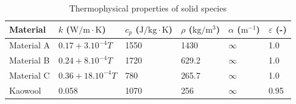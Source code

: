 \documentclass[12pt]{article}
\begin{document}
\begin{table}[H]
\centering
\caption{Thermophysical properties of solid species}
\label{tab:phys_props}
\begin{tabular}{@{}llllll@{}}
\toprule
Material & $k$ ($\mathrm{W/m{\cdot}K}$) & $c_p$ ($\mathrm{J/kg{\cdot}K}$) & $\rho$ ($\mathrm{kg/m^3}$) & $\alpha$ ($\mathrm{m^{-1}}$) & $\varepsilon$ (-) \\
\midrule
Material A & $0.17 + 3.10^{-4}T$ & 1550 & 1430 & $\infty$ & 1.0 \\
Material B & $0.24 + 8.10^{-4}T$ & 1720 & 629.2 & $\infty$ & 1.0 \\
Material C & $0.36 + 18.10^{-4}T$ & 780  & 265.7 & $\infty$ & 1.0 \\
Kaowool    & 0.058               & 1070  & 256   & $\infty$ & 0.95 \\
\bottomrule
\end{tabular}
\end{table}
\end{document}
